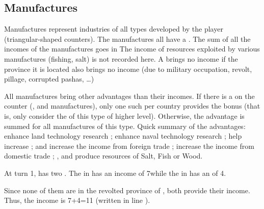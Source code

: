 \subsection{Manufactures}\label{chIncomes:Manufactures}
\aparag Manufactures represent industries of all types developed by the
player (triangular-shaped counters).
\aparag The manufactures all have a .
\bparag The sum of all the incomes of the manufactures goes in
\bparag The income of resources exploited by various manufactures
(fishing, salt) is not recorded here.
\bparag A \MNU brings no income if the province it is located also
brings no income (due to military occupation, revolt, pillage,
corrupted pashas, \ldots)

\aparag All manufactures bring other advantages than their incomes.
\bparag If there is a \textetoile on the counter (,
 and  manufactures), only one such \MNU per
country provides the bonus (that is, only consider the \MNU of this type
of higher level).
\bparag Otherwise, the advantage is summed for all manufactures of this
type.
\bparag Quick summary of the advantages:  \MNU enhance land
technology research ;  \MNU enhance naval technology
research ;  \MNU help increase \STAB ;  and 
\MNU increase the income from foreign trade ;  \MNU increase
the income from domestic trade ; ,  and 
\MNU produce resources of Salt, Fish or Wood.

\begin{exemple}
  At turn 1, \POR has two \MNU. The  \MNU in
  \provinceTejo has an income of 7\ducats while the  \MNU in
   has an of 4\ducats.

  Since none of them are in the revolted province of \provinceBeira,
  both provide their income. Thus, the income is 7+4=11\ducats
  (written in line ).
\end{exemple}

